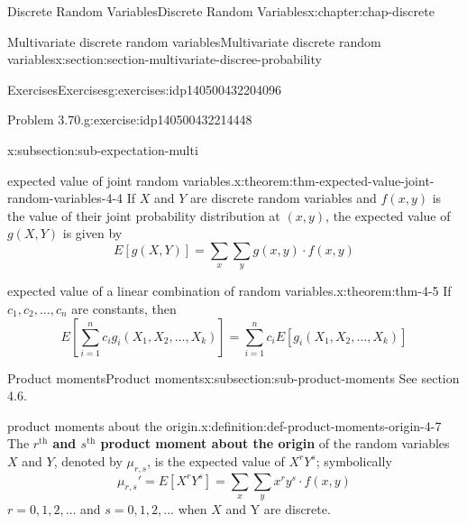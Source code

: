 \documentclass[oneside,10pt,]{book}
\newcommand{\terminology}[1]{\textbf{#1}}
\begin{document}
\begin{chapterptx}{Discrete Random Variables}{}{Discrete Random Variables}{}{}{x:chapter:chap-discrete}
\begin{sectionptx}{Multivariate discrete random variables}{}{Multivariate discrete random variables}{}{}{x:section:section-multivariate-discree-probability}
\begin{exercises-subsection}{Exercises}{}{Exercises}{}{}{g:exercises:idp140500432204096}
\begin{divisionexercise}{4}{Problem 3.70.}{}{g:exercise:idp140500432214448}
\begin{enumerate}[label=(\alph*)]
\end{enumerate}
%
\end{divisionexercise}%
\end{exercises-subsection}
%
%
\typeout{************************************************}
\typeout{************************************************}
%
\begin{subsectionptx}{}{}{}{}{}{x:subsection:sub-expectation-multi}
\begin{theorem}{expected value of joint random variables.}{}{x:theorem:thm-expected-value-joint-random-variables-4-4}%
If \(X\) and \(Y\) are discrete random variables and \(\displaystyle f(x, y)\) is the value of their joint probability distribution at \(\displaystyle (x, y)\), the expected value of \(\displaystyle g(X, Y)\) is given by%
\begin{equation*}
E[g(X, Y)] = \sum_x \sum_y g(x, y)\cdot f(x,y)
\end{equation*}
%
\end{theorem}
\begin{theorem}{expected value of a linear combination of random variables.}{}{x:theorem:thm-4-5}%
If \(\displaystyle c_1, c_2, \dots, c_n\) are constants, then%
\begin{equation*}
E\left[\sum_{i=1}^n c_i g_i(X_1, X_2, \dots, X_k)\right] =
\sum_{i=1}^n c_i E\left[g_i(X_1, X_2, \dots, X_k)\right]
\end{equation*}
%
\end{theorem}
\end{subsectionptx}
%
%
\typeout{************************************************}
\typeout{************************************************}
%
\begin{subsectionptx}{Product moments}{}{Product moments}{}{}{x:subsection:sub-product-moments}
See section 4.6.%
\begin{definition}{product moments about the origin.}{x:definition:def-product-moments-origin-4-7}%
The \terminology{\(\displaystyle r^\text{th}\) and \(\displaystyle
s^\text{th}\) product moment about the origin} of the random variables \(X\) and \(Y\), denoted by \(\displaystyle \mu_{r,s}\), is the expected value of \(\displaystyle X^rY^s\); symbolically%
\begin{equation*}
\mu_{r,s}'=E[X^rY^s] = \sum_x\sum_y x^r y^s\cdot f(x, y)
\end{equation*}
\(\displaystyle r = 0,1,2, \dots\) and \(\displaystyle s = 0,1,2,
\dots\) when \(X\) and Y are discrete.%
\end{definition}

\end{subsectionptx}
\end{sectionptx}
\end{chapterptx}
\end{document}

